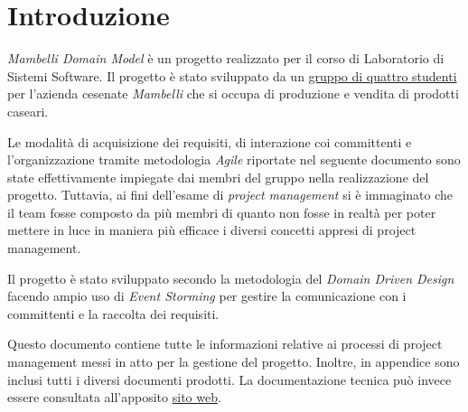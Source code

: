 \chapter*{Introduzione}

\emph{Mambelli Domain Model} è un progetto realizzato per il corso di Laboratorio di Sistemi Software. 
Il progetto è stato sviluppato da un \href{https://atedeg.dev/about}{gruppo di quattro studenti} per l'azienda cesenate \emph{Mambelli} che si occupa di produzione e vendita di prodotti caseari.

Le modalità di acquisizione dei requisiti, di interazione coi committenti e l'organizzazione tramite metodologia \emph{Agile} riportate nel seguente documento sono state effettivamente impiegate dai membri del gruppo nella realizzazione del progetto. Tuttavia, ai fini dell'esame di \emph{project management} si è immaginato che il team fosse composto da più membri di quanto non fosse in realtà per poter mettere in luce in maniera più efficace i diversi concetti appresi di project management.

Il progetto è stato sviluppato secondo la metodologia del \emph{Domain Driven Design} facendo ampio uso di \emph{Event Storming} per gestire la comunicazione con i committenti e la raccolta dei requisiti. 

Questo documento contiene tutte le informazioni relative ai processi di project management messi in atto per la gestione del progetto. Inoltre, in appendice sono inclusi tutti i diversi documenti prodotti.
La documentazione tecnica può invece essere consultata all'apposito \href{https://atedeg.dev/mdm}{sito web}.
